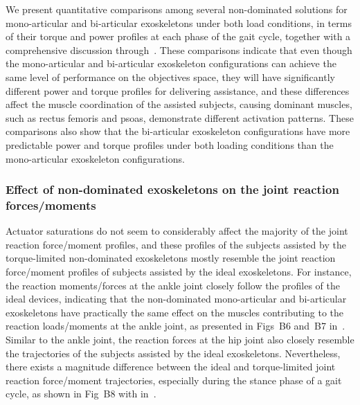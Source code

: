 \documentclass[10pt,letterpaper]{article}
\begin{document}
We present quantitative comparisons among several non-dominated solutions for mono-articular and bi-articular exoskeletons under both load conditions, in terms of their torque and power profiles at each phase of the gait cycle, together with a comprehensive discussion through~\cite{Alibonab2021_thesis}. These comparisons indicate that even though the mono-articular and bi-articular exoskeleton configurations can achieve the same level of performance on the objectives space, they will have significantly different power and torque profiles for delivering assistance, and these differences affect the muscle coordination of the assisted subjects, causing dominant muscles, such as rectus femoris and psoas, demonstrate different activation patterns. These comparisons also show that the bi-articular exoskeleton configurations have more predictable power and torque profiles under both loading conditions than the mono-articular exoskeleton configurations.

\bigskip
\subsubsection*{Effect of non-dominated exoskeletons on the joint reaction forces/moments}


Actuator saturations do not seem to considerably affect the majority of the joint reaction force/moment profiles, and  these profiles of the subjects assisted by the torque-limited non-dominated exoskeletons mostly resemble the joint reaction force/moment profiles of subjects assisted by the ideal exoskeletons. For instance, the reaction moments/forces at the ankle joint closely follow the profiles of the ideal devices, indicating that the non-dominated  mono-articular and bi-articular exoskeletons have practically the same effect on the muscles contributing to the reaction loads/moments at the ankle joint, as presented in Figs~B6 and~B7 in~.  Similar to the ankle joint, the reaction forces at the hip joint also closely resemble the trajectories of the subjects assisted by the ideal exoskeletons. Nevertheless, there exists a magnitude difference between the ideal and torque-limited joint reaction force/moment trajectories, especially during the stance phase of a gait cycle, as shown in Fig~B8 with  in~.
\end{document}
